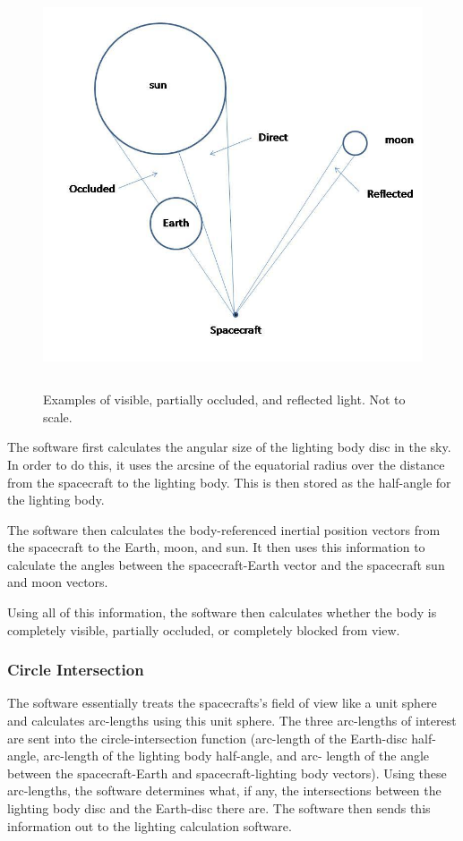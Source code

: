 \begin{figure}[H]
\begin{center}
\includegraphics[height=120mm]{pics/lighting_pic.jpg}
\caption{Examples of visible, partially occluded, and reflected light.
Not to scale.}
\label{lighting_pic}
\end{center}
\end{figure}

The software first calculates the angular size of the lighting body disc in the
sky.  In order to do this, it uses the arcsine of the equatorial radius over the
distance from the spacecraft to the lighting body.  This is then stored as the
half-angle for the lighting body.

The software then calculates the body-referenced inertial position vectors from
the spacecraft to the Earth, moon, and sun.  It then uses this information to
calculate the angles between the spacecraft-Earth vector and the spacecraft
sun and moon vectors.

Using all of this information, the software then calculates whether the body
is completely visible, partially occluded, or completely blocked from view.

\subsubsection{Circle Intersection}
The software essentially treats the spacecrafts's field of view like a
unit sphere and
calculates arc-lengths using this unit sphere.  The three arc-lengths of
interest are sent into the circle-intersection function (arc-length of the
Earth-disc half-angle, arc-length of the lighting body half-angle, and arc-
length of the angle between the spacecraft-Earth and spacecraft-lighting body
vectors).  Using these arc-lengths, the software determines what, if any, the
intersections between the lighting body disc and the Earth-disc there are.
The software then sends this information out to the lighting calculation
software.


